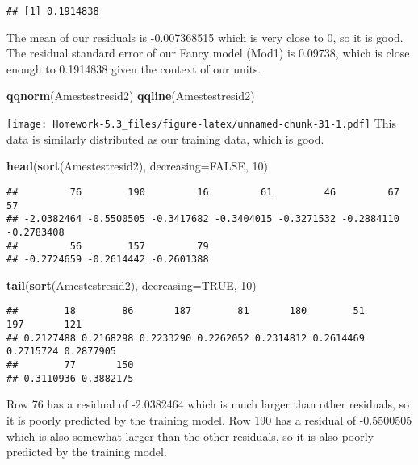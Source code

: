 \documentclass[
]{article}
\newenvironment{Shaded}{\begin{snugshade}}{\end{snugshade}}
\newcommand{\DataTypeTok}[1]{\textcolor[rgb]{0.13,0.29,0.53}{#1}}
\newcommand{\DecValTok}[1]{\textcolor[rgb]{0.00,0.00,0.81}{#1}}
\newcommand{\KeywordTok}[1]{\textcolor[rgb]{0.13,0.29,0.53}{\textbf{#1}}}
\newcommand{\NormalTok}[1]{#1}
\newcommand{\OtherTok}[1]{\textcolor[rgb]{0.56,0.35,0.01}{#1}}
\begin{document}
\begin{verbatim}
## [1] 0.1914838
\end{verbatim}

The mean of our residuals is -0.007368515 which is very close to 0, so
it is good. The residual standard error of our Fancy model (Mod1) is
0.09738, which is close enough to 0.1914838 given the context of our
units.

\begin{Shaded}
\begin{Highlighting}[]
\KeywordTok{qqnorm}\NormalTok{(Amestestresid2)}
\KeywordTok{qqline}\NormalTok{(Amestestresid2)}
\end{Highlighting}
\end{Shaded}

\texttt{[image: Homework-5.3\_files/figure-latex/unnamed-chunk-31-1.pdf]}
This data is similarly distributed as our training data, which is good.

\begin{Shaded}
\begin{Highlighting}[]
\KeywordTok{head}\NormalTok{(}\KeywordTok{sort}\NormalTok{(Amestestresid2), }\DataTypeTok{decreasing=}\OtherTok{FALSE}\NormalTok{, }\DecValTok{10}\NormalTok{)}
\end{Highlighting}
\end{Shaded}

\begin{verbatim}
##         76        190         16         61         46         67         57 
## -2.0382464 -0.5500505 -0.3417682 -0.3404015 -0.3271532 -0.2884110 -0.2783408 
##         56        157         79 
## -0.2724659 -0.2614442 -0.2601388
\end{verbatim}

\begin{Shaded}
\begin{Highlighting}[]
\KeywordTok{tail}\NormalTok{(}\KeywordTok{sort}\NormalTok{(Amestestresid2), }\DataTypeTok{decreasing=}\OtherTok{TRUE}\NormalTok{, }\DecValTok{10}\NormalTok{)}
\end{Highlighting}
\end{Shaded}

\begin{verbatim}
##        18        86       187        81       180        51       197       121 
## 0.2127488 0.2168298 0.2233290 0.2262052 0.2314812 0.2614469 0.2715724 0.2877905 
##        77       150 
## 0.3110936 0.3882175
\end{verbatim}

Row 76 has a residual of -2.0382464 which is much larger than other
residuals, so it is poorly predicted by the training model. Row 190 has
a residual of -0.5500505 which is also somewhat larger than the other
residuals, so it is also poorly predicted by the training model.
\end{document}
